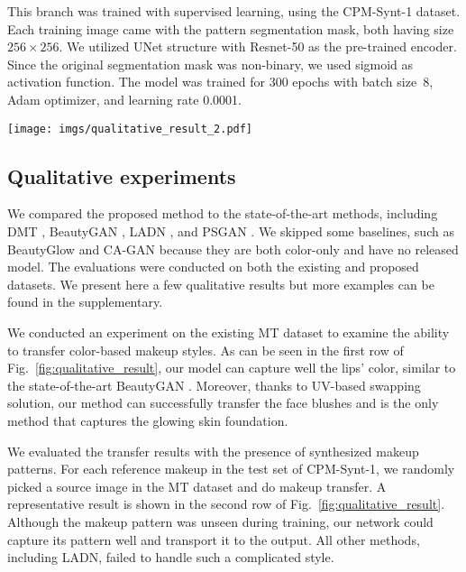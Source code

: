 \documentclass[final]{cvpr}
\newcommand{\Fref}[1]{Fig.~\ref{#1}}
\begin{document}
 This branch was trained with supervised learning, using the CPM-Synt-1 dataset. Each training image came with the pattern segmentation mask, both having size $256{\times}256$. We utilized UNet structure with Resnet-50 as the pre-trained encoder. Since the original segmentation mask was non-binary, we used sigmoid as activation function. The model was trained for 300 epochs with batch size~8, Adam optimizer, and learning rate 0.0001.




\begin{figure*}[t]
\centering 
\texttt{[image: imgs/qualitative\_result\_2.pdf]}
\vskip -0.1in
   \caption{Qualitative Results}
   \vspace{-3mm}
\label{fig:qualitative_result}
\end{figure*}

\subsection{Qualitative experiments}
\vspace{-2mm}
We compared the proposed method to the state-of-the-art methods, including DMT \cite{dmt}, BeautyGAN \cite{beautygan}, LADN \cite{gu2019ladn}, and PSGAN \cite{jiang2019psgan}. We skipped some baselines, such as BeautyGlow \cite{beautyglow} and CA-GAN \cite{kips2020cagan} because they are both color-only and have no released model. The evaluations were conducted on both the existing and proposed datasets. We present here a few qualitative results but more examples can be found in the supplementary.

 We conducted an experiment on the existing MT dataset \cite{beautygan} to examine the ability to transfer color-based makeup styles. As can be seen in the first row of \Fref{fig:qualitative_result}, our model can capture well the lips' color, similar to the state-of-the-art BeautyGAN \cite{beautygan}. Moreover, thanks to UV-based swapping solution, our method can successfully transfer the face blushes and is the only method that captures the glowing skin foundation. 



 We evaluated the transfer results  with the presence of synthesized makeup patterns. For each reference makeup in the test set of CPM-Synt-1, we randomly picked a source image in the MT dataset and do makeup transfer. A representative result is shown in the second row of \Fref{fig:qualitative_result}. Although the makeup pattern was unseen during training, our network could capture its pattern well and transport it to the output. All other methods, including LADN, failed to handle such a complicated style.
\end{document}
